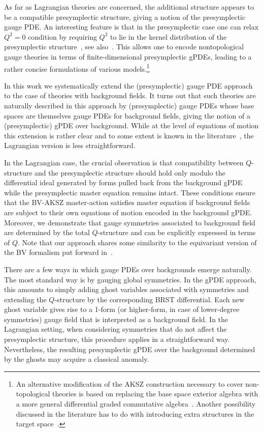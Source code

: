\documentclass[a4paper,12pt]{article}
\numberwithin{equation}{section} %
\begin{document}
As far as Lagrangian theories are concerned, the additional structure appears to be a compatible presymplectic structure, giving a notion of the presymplectic gauge PDE. An interesting feature is that in the presymplectic case one can relax $Q^2=0$ condition by requiring $Q^2$ to lie in the kernel distribution of the presymplectic structure~\cite{Grigoriev:2022zlq,Dneprov:2024cvt}, see also~\cite{Alkalaev:2013hta,Grigoriev:2016wmk,Grigoriev:2020xec}. This allows one to encode nontopological gauge theories in terms of finite-dimensional presymplectic gPDEs, leading to a rather concise formulations of various models.\footnote{An alternative modification of the AKSZ construction necessary to cover non-topological theories is based on replacing the base space exterior algebra  with a more general differential graded commutative algebra~\cite{Bonechi:2009kx,costello2011renormalization,Bonechi:2022aji}. Another possibility discussed in the literature has to do with introducing extra structures in the target space~\cite{Arvanitakis:2025nyy}.}

In this work we systematically extend the (presymplectic) gauge PDE approach to the case of theories with background fields. It turns out that such theories  are naturally described in this approach by (presymplectic) gauge PDEs whose base spaces are themselves gauge PDEs  for background fields, giving the notion of a (presymplectic) gPDE over background. While at the level of equations of motion this extension is rather clear and to some extent is known in the literature~\cite{Shaynkman:2004vu,Ponomarev:2010ji,Barnich:2010sw}, the Lagrangian version is less straightforward.

In the Lagrangian case, the crucial observation is that compatibility between $Q$-structure and the presymplectic structure should hold only modulo the differential ideal generated by forms pulled back from the background gPDE while the presymplectic master equation remains intact. These conditions ensure that the BV-AKSZ master-action satisfies master equation if background fields are subject to their own equations of motion encoded in the background gPDE. Moreover, we demonstrate that gauge symmetries associated to background field are determined by the total $Q$-structure and can be explicitly expressed in terms of $Q$. Note that our approach shares some similarity to the equivariant version of the BV formalism put forward in~\cite{Bonechi:2019dqk,Mnev:2012qd,Bonechi:2022aji,Cattaneo:2024ows}.

There are a few ways in which gauge PDEs over backgrounds emerge naturally. The most standard way is by gauging global symmetries. In the gPDE approach, this amounts to simply adding ghost variables associated with symmetries and extending the $Q$-structure by the corresponding BRST differential. Each new ghost variable gives rise to a 1-form (or higher-form, in case of lower-degree symmetries) gauge field that is interpreted as a background field.  In the Lagrangian setting, when considering symmetries that do not affect the presymplectic structure, this procedure applies in a straightforward way. Nevertheless, the resulting presymplectic gPDE over the background determined by the ghosts may acquire a classical anomaly.
\end{document}
